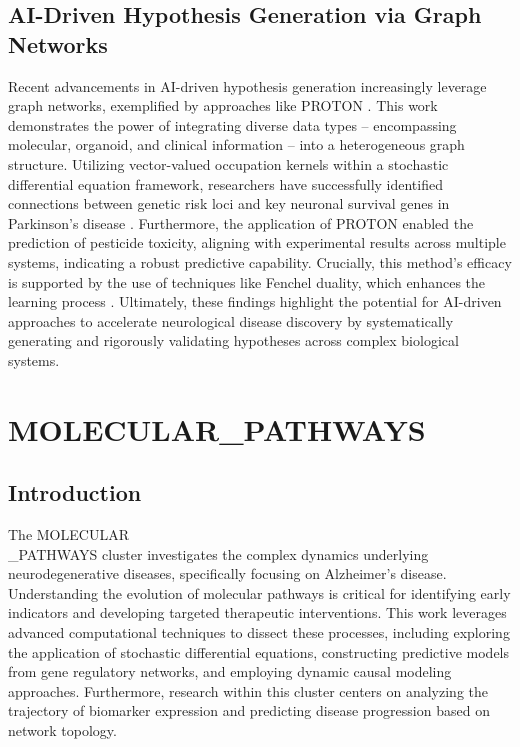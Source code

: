 \documentclass[11pt,a4paper]{article}
\begin{document}
\subsection{AI-Driven Hypothesis Generation via Graph Networks}
Recent advancements in AI-driven hypothesis generation increasingly leverage graph networks, exemplified by approaches like PROTON \cite{arxiv251213724}. This work demonstrates the power of integrating diverse data types – encompassing molecular, organoid, and clinical information – into a heterogeneous graph structure. Utilizing vector-valued occupation kernels within a stochastic differential equation framework, researchers have successfully identified connections between genetic risk loci and key neuronal survival genes in Parkinson’s disease \cite{arxiv251213724}.  Furthermore, the application of PROTON enabled the prediction of pesticide toxicity, aligning with experimental results across multiple systems, indicating a robust predictive capability.  Crucially, this method’s efficacy is supported by the use of techniques like Fenchel duality, which enhances the learning process \cite{arxiv250511622}.  Ultimately, these findings highlight the potential for AI-driven approaches to accelerate neurological disease discovery by systematically generating and rigorously validating hypotheses across complex biological systems.

\section{MOLECULAR\_PATHWAYS}
\subsection*{Introduction}
The MOLECULAR\\\_PATHWAYS cluster investigates the complex dynamics underlying neurodegenerative diseases, specifically focusing on Alzheimer’s disease. Understanding the evolution of molecular pathways is critical for identifying early indicators and developing targeted therapeutic interventions. This work leverages advanced computational techniques to dissect these processes, including exploring the application of stochastic differential equations, constructing predictive models from gene regulatory networks, and employing dynamic causal modeling approaches.  Furthermore, research within this cluster centers on analyzing the trajectory of biomarker expression and predicting disease progression based on network topology.
\end{document}
